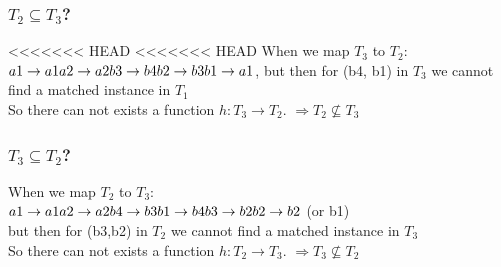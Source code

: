 \documentclass[12pt]{article}
\begin{document}
	\subsubsection*{$T_2 \subseteq T_3$?} %
<<<<<<< HEAD
<<<<<<< HEAD
When we map $T_3$ to $T_2$:\\
$a1\rightarrow a1\\
a2\rightarrow a2\\
b3\rightarrow b4\\
b2\rightarrow b3\\
b1\rightarrow a1$, but then for (b4, b1) in $T_3$ we cannot find a matched instance in $T_1$\\
So there can not exists a function $h: T_3 \rightarrow T_2$. $\Rightarrow T_2 \not\subseteq T_3$	
	
	\subsubsection*{$T_3 \subseteq T_2$?} %
%	
When we map $T_2$ to $T_3$:\\
$a1\rightarrow a1\\
a2\rightarrow a2\\
b4\rightarrow b3\\
b1\rightarrow b4\\
b3\rightarrow b2\\
b2\rightarrow b2$ (or b1)\\
but then for (b3,b2) in $T_2$ we cannot find a matched instance in $T_3$\\
So there can not exists a function $h: T_2 \rightarrow T_3$. $\Rightarrow T_3 \not\subseteq T_2$
\end{document}

